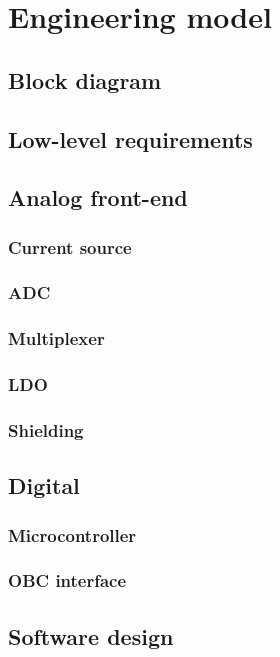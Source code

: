 \chapter{Engineering model}

\section{Block diagram}

\section{Low-level requirements}

\section{Analog front-end}
\subsection{Current source}
\subsection{ADC}
\subsection{Multiplexer}
\subsection{LDO}
\subsection{Shielding}

\section{Digital}
\subsection{Microcontroller}
\subsection{OBC interface}

\section{Software design}
